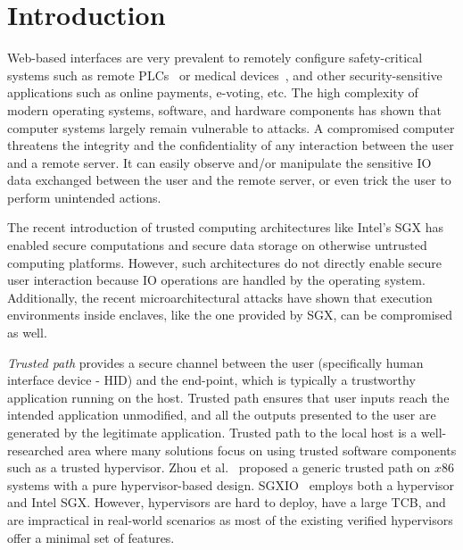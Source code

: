 \section{Introduction}
\label{sec:intro}

Web-based interfaces are very prevalent to remotely configure safety-critical systems such as remote PLCs~\cite{controlbyweb} or medical devices~\cite{medicalDevice}, and other security-sensitive applications such as online payments, e-voting, etc. The high complexity of modern operating systems, software, and hardware components has shown that computer systems largely remain vulnerable to attacks. A compromised computer threatens the integrity and the confidentiality of any interaction between the user and a remote server. It can easily observe and/or manipulate the sensitive IO data exchanged between the user and the remote server, or even trick the user to perform unintended actions. 

The recent introduction of trusted computing architectures like Intel's SGX has enabled secure computations and secure data storage on otherwise untrusted computing platforms. However, such architectures do not directly enable secure user interaction because IO operations are handled by the operating system. Additionally, the recent microarchitectural attacks have shown that execution environments inside enclaves, like the one provided by SGX, can be compromised as well.


\emph{Trusted path} provides a secure channel between the user (specifically human interface device - HID) and the end-point, which is typically a trustworthy application running on the host. Trusted path ensures that user inputs reach the intended application unmodified, and all the outputs presented to the user are generated by the legitimate application. Trusted path to the local host is a well-researched area where many solutions focus on using trusted software components such as a trusted hypervisor. Zhou et al.~\cite{zhou2012building} proposed a generic trusted path on $x86$ systems with a pure hypervisor-based design. SGXIO~\cite{weiser2017sgxio} employs both a hypervisor and Intel SGX. However, hypervisors are hard to deploy, have a large TCB, and are impractical in real-world scenarios as most of the existing verified hypervisors offer a minimal set of features. 



